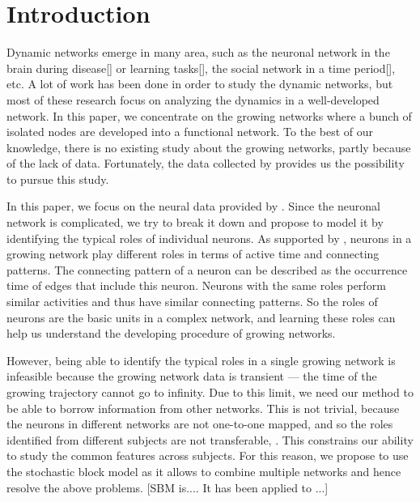 

\section{Introduction}

Dynamic networks emerge in many area,
such as the neuronal network in the brain during disease[] or learning tasks[], 
the social network in a time period[], etc.
A lot of work has been done in order to study the dynamic networks,
but most of these research focus on analyzing the dynamics in a well-developed network.
In this paper, we concentrate on the growing networks where a bunch of isolated nodes are developed into a functional network.
To the best of our knowledge, there is no existing study about the growing networks, partly because of the lack of data.
Fortunately, the data collected by \citet{Wan2019} provides us the possibility to pursue this study.


In this paper, we focus on the neural data provided by \cite{Wan2019}.
Since the neuronal network is complicated, we try to break it down and propose to model it by identifying the typical roles of individual neurons. 
As supported by \cite{Wan2019}, neurons in a growing network play different roles in terms of active time and connecting patterns. 
The connecting pattern of a neuron can be described as the occurrence time of edges that include this neuron. 
Neurons with the same roles perform similar activities and thus have similar connecting patterns. 
So the roles of neurons are the basic units in a complex network, and learning these roles can help us understand the developing procedure of growing networks.


However, being able to identify the typical roles in a single growing network is  infeasible because 
the growing network data is transient --- 
the time of the growing trajectory cannot go to infinity.
Due to this limit, we need  our method to be able to borrow information from other networks.
This is not trivial, because the neurons in different networks are not one-to-one mapped, and so
the roles identified from different subjects are not transferable, 
. 
This constrains our ability to study the common features across subjects.
For this reason, we propose to use the stochastic block model as it allows to combine multiple networks and hence resolve the above problems.
[SBM is.... It has been applied to ...]


